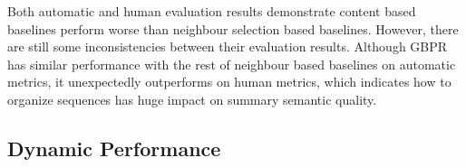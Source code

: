 Both automatic and human evaluation results demonstrate content based baselines perform worse than neighbour selection based baselines. However, there are still some inconsistencies between their evaluation results. Although GBPR has similar performance with the rest of neighbour based baselines on automatic metrics, it unexpectedly outperforms on human metrics, which indicates how to organize sequences has huge impact on summary semantic quality.

\subsection{Dynamic Performance} 
\begin{figure} 
	\centering 
	\\ 

\end{figure}
